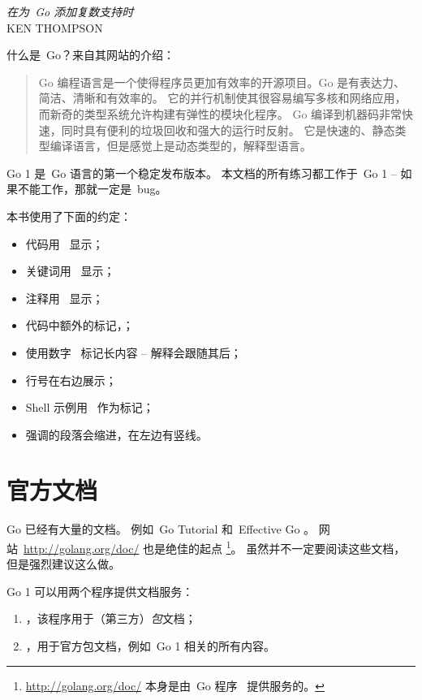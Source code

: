 {\textit{在为~Go 添加复数支持时}\\ \textsc{KEN THOMPSON}}

\noindent{}什么是~Go？来自其网站\cite{go_web}的介绍：
\begin{quote}
Go 编程语言是一个使得程序员更加有效率的开源项目。Go 是有表达力、简洁、清晰和有效率的。
它的并行机制使其很容易编写多核和网络应用，而新奇的类型系统允许构建有弹性的模块化程序。
Go 编译到机器码非常快速，同时具有便利的垃圾回收和强大的运行时反射。
它是快速的、静态类型编译语言，但是感觉上是动态类型的，解释型语言。
\end{quote}

Go 1 是~Go 语言的第一个稳定发布版本。
本文档的所有练习都工作于~Go 1 -- 如果不能工作，那就一定是~bug。

本书使用了下面的约定：
\begin{itemize}
\item 代码用~ 显示；
\item 关键词用~ 显示；
\item 注释用~ 显示；
\item 代码中额外的标记，；
\item 使用数字~ 标记长内容 -- 解释会跟随其后；
\item 行号在右边展示；
\item Shell 示例用~\pr{} 作为标记；
\item 强调的段落会缩进，在左边有竖线。
\end{itemize}

\section{官方文档}
Go 已经有大量的文档。
例如~Go Tutorial \cite{go_tutorial} 和~Effective Go \cite{effective_go}。
网站~\url{http://golang.org/doc/} 也是绝佳的起点 
\footnote{\url{http://golang.org/doc/} 本身是由~Go 程序~ 提供服务的。}。
虽然并不一定要阅读这些文档，但是强烈建议这么做。

Go 1 可以用两个程序提供文档服务：
\begin{enumerate}
\item {}，该程序用于（第三方）\emph{包}文档；
\item {}，用于官方包文档，例如~Go 1 相关的所有内容。
\end{enumerate}

